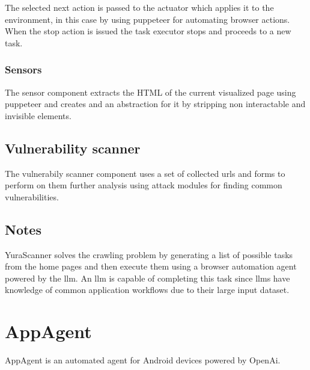 The selected next action is passed to the actuator which applies it to
the environment, in this case by using puppeteer for automating browser
actions. When the stop action is issued the task executor stops and
proceeds to a new task.

\subsubsection{Sensors}\label{sensors}

The sensor component extracts the HTML of the current visualized page
using puppeteer and creates and an abstraction for it by stripping non
interactable and invisible elements.

\subsection{Vulnerability scanner}\label{vulnerability-scanner}

The vulnerabily scanner component uses a set of collected urls and forms
to perform on them further analysis using attack modules for finding
common vulnerabilities.

\subsection{Notes}\label{notes}

YuraScanner solves the crawling problem by generating a list of possible
tasks from the home pages and then execute them using a browser
automation agent powered by the llm. An llm is capable of completing
this task since llms have knowledge of common application workflows due
to their large input dataset.

\section{AppAgent}\label{appagent}

AppAgent \autocite{yang2023appagent} is an automated agent for Android
devices powered by OpenAi.

